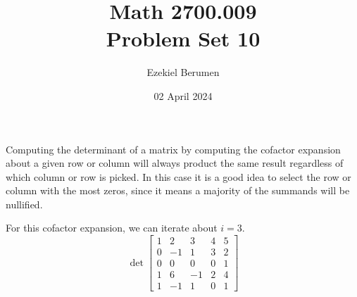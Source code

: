 \documentclass{report}
\title{\Huge{Math 2700.009}\\Problem Set 10}
\author{\huge{Ezekiel Berumen}}
\date{02 April 2024}
\begin{document}
\maketitle
\newpage

\begin{note}
Computing the determinant of a matrix by computing the cofactor expansion about a given row or column will always product the same result regardless of which column or row is picked.  In this case it is a good idea to select the row or column with the most zeros,  since it means a majority of the summands will be nullified.
\end{note}
\sol For this cofactor expansion,  we can iterate about $i=3$.  \\
$$
\operatorname{det}
\begin{bmatrix}
1&2&3&4&5\\
0&-1&1&3&2\\
0&0&0&0&1\\
1&6&-1&2&4\\
1&-1&1&0&1 
\end{bmatrix}
$$
\end{document}
